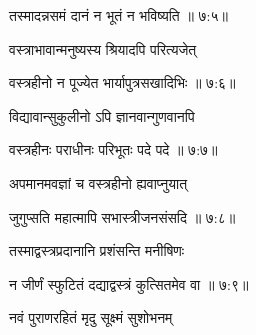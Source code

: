 
{\devanagarifont तस्मादन्नसमं दानं न भूतं न भविष्यति {॥ ७:५॥} \veg\dontdisplaylinenum }%



{\devanagarifont वस्त्राभावान्मनुष्यस्य श्रियादपि परित्यजेत् \thinspace{\dandab} \dontdisplaylinenum }%


{\devanagarifont वस्त्रहीनो न पूज्येत भार्यापुत्रसखादिभिः {॥ ७:६॥} \veg\dontdisplaylinenum }%
 
{\devanagarifont विद्यावान्सुकुलीनो ऽपि ज्ञानवान्गुणवानपि \thinspace{\dandab} \dontdisplaylinenum }%
 

{\devanagarifont वस्त्रहीनः पराधीनः परिभूतः पदे पदे {॥ ७:७॥} \veg\dontdisplaylinenum }%
 
{\devanagarifont अपमानमवज्ञां च वस्त्रहीनो ह्यवाप्नुयात् \thinspace{\dandab} \dontdisplaylinenum }%


{\devanagarifont जुगुप्सति महात्मापि सभास्त्रीजनसंसदि {॥ ७:८॥} \veg\dontdisplaylinenum }%
 
{\devanagarifont तस्माद्वस्त्रप्रदानानि प्रशंसन्ति मनीषिणः \thinspace{\dandab} \dontdisplaylinenum }%
 

{\devanagarifont न जीर्णं स्फुटितं दद्याद्वस्त्रं कुत्सितमेव वा {॥ ७:९॥} \veg\dontdisplaylinenum }%

{\devanagarifont नवं पुराणरहितं मृदु सूक्ष्मं सुशोभनम् \thinspace{\dandab} \dontdisplaylinenum }%

